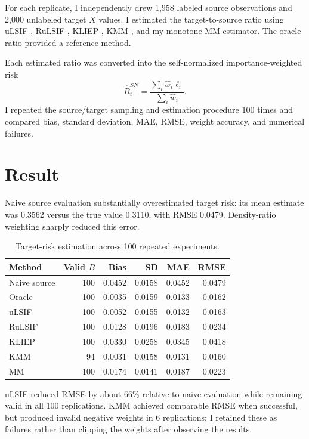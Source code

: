 \documentclass[11pt]{article}
\begin{document}
For each replicate, I independently drew 1,958 labeled source observations and 2,000 unlabeled target $X$ values. I estimated the target-to-source ratio using uLSIF \citep{kanamori2009least}, RuLSIF \citep{yamada2011relative}, KLIEP \citep{sugiyama2008direct}, KMM \citep{huang2007correcting}, and my monotone MM estimator. The oracle ratio provided a reference method.

Each estimated ratio was converted into the self-normalized importance-weighted risk
\[
\widehat R_t^{SN}=
\frac{\sum_i \widehat w_i\ell_i}
{\sum_i \widehat w_i}.
\]
I repeated the source/target sampling and estimation procedure 100 times and compared bias, standard deviation, MAE, RMSE, weight accuracy, and numerical failures.

\section{Result}

Naive source evaluation substantially overestimated target risk: its mean estimate was 0.3562 versus the true value 0.3110, with RMSE 0.0479. Density-ratio weighting sharply reduced this error.

\begin{table}[H]
\centering
\caption{Target-risk estimation across 100 repeated experiments.}
\label{tab:risk}
\begin{tabular}{lrrrrr}
\toprule
Method & Valid $B$ & Bias & SD & MAE & RMSE \\
\midrule
Naive source & 100 & 0.0452 & 0.0158 & 0.0452 & 0.0479 \\
Oracle       & 100 & 0.0035 & 0.0159 & 0.0133 & 0.0162 \\
uLSIF        & 100 & 0.0052 & 0.0155 & 0.0132 & 0.0163 \\
RuLSIF       & 100 & 0.0128 & 0.0196 & 0.0183 & 0.0234 \\
KLIEP        & 100 & 0.0330 & 0.0258 & 0.0345 & 0.0418 \\
KMM          & 94  & 0.0031 & 0.0158 & 0.0131 & 0.0160 \\
MM           & 100 & 0.0174 & 0.0141 & 0.0187 & 0.0223 \\
\bottomrule
\end{tabular}
\end{table}

uLSIF reduced RMSE by about 66\% relative to naive evaluation while remaining valid in all 100 replications. KMM achieved comparable RMSE when successful, but produced invalid negative weights in 6 replications; I retained these as failures rather than clipping the weights after observing the results.
\end{document}
